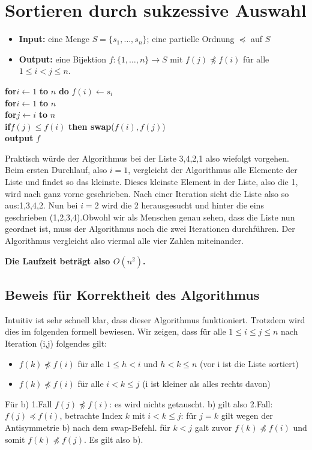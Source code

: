 \documentclass{article}
\begin{document}
\section{Sortieren durch sukzessive Auswahl}



\begin{itemize}
\item \textbf{Input:} eine Menge $S = \{s_1, \dots, s_n\}$; eine partielle Ordnung $\preceq $ auf $S$ 
\item \textbf{Output:}  eine Bijektion $f: \{1, \dots, n\} \to S$ mit $f(j) \not\preceq f(i)$ für alle $1 \le i < j \le n$.
\end{itemize}
\textbf{for}{$i \leftarrow 1$ \textbf{to} $n$} \textbf{do} $f(i) \leftarrow s_i$\\
    \textbf{for}{$i \leftarrow 1$ \textbf{to} $n$}\\
        \textbf{for}{$j \leftarrow i$ \textbf{to} $n$}\\
            \textbf{if}{$f(j) \le f(i)$} 
                \textbf{then swap}($f(i), f(j)$)\\
            \textbf{output} $f$


Praktisch würde der Algorithmus bei der Liste {3,4,2,1} also wiefolgt vorgehen. Beim ersten Durchlauf, also $i=1$, vergleicht der Algorithmus alle Elemente der Liste und findet so das kleinste. Dieses kleinste Element in der Liste, also die 1, wird nach ganz vorne geschrieben. Nach einer Iteration sieht die Liste also so aus:{1,3,4,2}. Nun bei $i=2$ wird die 2 herausgesucht und hinter die eins geschrieben ({1,2,3,4}).Obwohl wir als Menschen genau sehen, dass die Liste nun geordnet ist, muss der Algorithmus noch die zwei Iterationen durchführen. Der Algorithmus vergleicht also viermal alle vier Zahlen miteinander.

\textbf{Die Laufzeit beträgt also $O(n^2)$.}

\subsection{Beweis für Korrektheit des Algorithmus}

Intuitiv ist sehr schnell klar, dass dieser Algorithmus funktioniert. Trotzdem wird dies im folgenden formell bewiesen.
Wir zeigen, dass für alle $1 \le i \le j \le n$  nach Iteration (i,j) folgendes gilt:
\begin{itemize}
\item[(a)]$f(k) \not \preceq f(i) $ für alle $1 \le h <i$ und $h<k\le n$ (vor i ist die Liste sortiert)
\item[(b)]$f(k) \not \preceq f(i)$ für alle $i<k \le j$ (i ist kleiner als alles rechts davon)
\end{itemize}
Für b)  1.Fall $f(j)\not \preceq f(i)$: es wird nichts getauscht. b) gilt also
	2.Fall:$ f(j) \preceq f(i)$, betrachte Index $k$ mit $i<k \le j$: für $j=k$ gilt wegen der Antisymmetrie b) nach dem swap-Befehl.
für $k<j$ galt zuvor $f(k)\not\preceq f(i)$ und somit $f(k) \not\preceq f(j)$. Es gilt also b).
\end{document}
